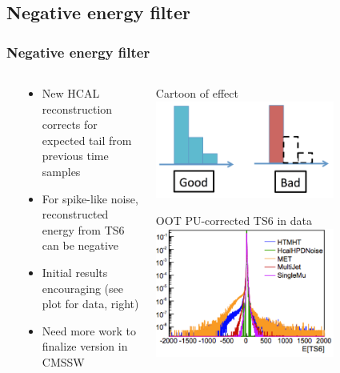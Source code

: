 \documentclass[bigger]{beamer}
\begin{document}
\subsection{Negative energy filter}
\label{sec-4-3}
\begin{frame}
\frametitle{Negative energy filter}
\label{sec-4-3-1}
\begin{columns} %
\label{sec-4-3-1-1}
\begin{column}{0.55\textwidth}
\label{sec-4-3-1-1-1}
\begin{itemize}

\item New HCAL reconstruction corrects for expected tail from previous time samples
\label{sec-4-3-1-1-1-1}%

\item For spike-like noise, reconstructed energy from TS6 can be negative
\label{sec-4-3-1-1-1-2}%

\item Initial results encouraging (see plot for data, right)
\label{sec-4-3-1-1-1-3}%

\item Need more work to finalize version in CMSSW
\label{sec-4-3-1-1-1-4}%
\end{itemize} %
\end{column}
\begin{column}{0.55\textwidth}
\label{sec-4-3-1-1-2}
\label{sec-4-3-1-1-2-1}

\centering
Cartoon of effect
\includegraphics[width=0.7\textwidth]{fig/negative.png}
\label{sec-4-3-1-1-2-2}

\centering
OOT PU-corrected TS6 in data
\includegraphics[width=0.7\textwidth]{fig/TS6.png}
\end{column}
\end{columns}
\end{frame}
\end{document}
